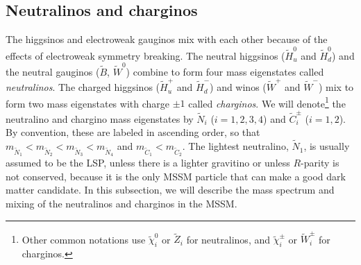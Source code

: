 \documentclass[11pt]{article}
\def\stilde{\widetilde}
\begin{document}
\subsection{Neutralinos and charginos}\label{subsec:MSSMspectrum.inos}
\setcounter{equation}{0}
\setcounter{footnote}{1}

The higgsinos and electroweak gauginos mix with each other because of the 
effects of electroweak symmetry breaking. The neutral higgsinos ($\stilde 
H_u^0$ and $\stilde H_d^0$) and the neutral gauginos ($\stilde B$, 
$\stilde W^0$) combine to form four mass eigenstates called {\it 
neutralinos}. The charged higgsinos ($\stilde H_u^+$ and $\stilde H_d^-$) 
and winos ($\stilde W^+$ and $\stilde W^-$) mix to form two mass 
eigenstates with charge $\pm 1$ called {\it charginos}. We will 
denote\footnote{Other common notations use $\stilde \chi_i^0$ or $\stilde 
Z_i$ for neutralinos, and $\stilde \chi^\pm_i$ or $\stilde W^\pm_i$ for 
charginos.} the neutralino and chargino mass eigenstates by $\stilde N_i$ 
($i=1,2,3,4$) and $\stilde C^\pm_i$ ($i=1,2$). By convention, these are 
labeled in ascending order, so that $m_{\stilde N_1} < m_{\stilde N_2} 
<m_{\stilde N_3} <m_{\stilde N_4}$ and $m_{\stilde C_1} < m_{\stilde 
C_2}$. The lightest neutralino, $\stilde N_1$, is usually assumed to be 
the LSP, unless there is a lighter gravitino or unless $R$-parity is not 
conserved, because it is the only MSSM particle that can make a good dark 
matter candidate. In this subsection, we will describe the mass spectrum 
and mixing of the neutralinos and charginos in the MSSM.
\end{document}
